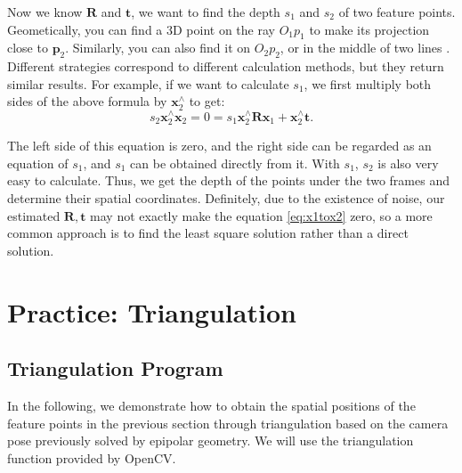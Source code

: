 Now we know $\mathbf{R}$ and $\mathbf{t}$, we want to find the depth $s_1$ and $s_2$ of two feature points. Geometically, you can find a 3D point on the ray $O_1 p_1$ to make its projection close to $\mathbf{p}_2$. Similarly, you can also find it on $O_2 p_2$, or in the middle of two lines . Different strategies correspond to different calculation methods, but they return similar results. For example, if we want to calculate $s_1$, we first multiply both sides of the above formula by $\mathbf{x}_2^\wedge$ to get:
\begin{equation}
\label{eq:x1tox2}
s_2 \mathbf{x}_2^\wedge \mathbf{x}_2 = 0 = s_1 \mathbf{x}_2^\wedge \mathbf{R} \mathbf{x}_1 + \mathbf{x}_2^\wedge \mathbf{t}. 
\end{equation}

The left side of this equation is zero, and the right side can be regarded as an equation of $s_1$, and $s_1$ can be obtained directly from it. With $s_1$, $s_2$ is also very easy to calculate. Thus, we get the depth of the points under the two frames and determine their spatial coordinates. Definitely, due to the existence of noise, our estimated $\mathbf{R}, \mathbf{t}$ may not exactly make the equation \eqref{eq:x1tox2} zero, so a more common approach is to find the least square solution rather than a direct solution.

\section{Practice: Triangulation}
\subsection{Triangulation Program}
In the following, we demonstrate how to obtain the spatial positions of the feature points in the previous section through triangulation based on the camera pose previously solved by epipolar geometry. We will use the triangulation function provided by OpenCV.

